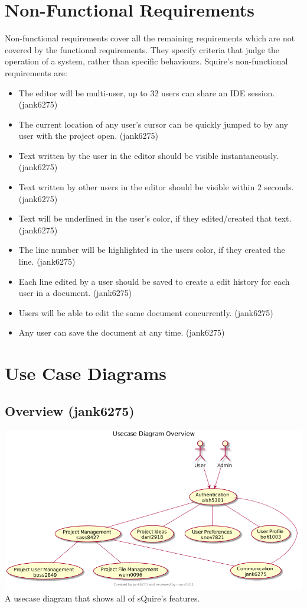 \documentclass[11pt]{report}
\begin{document}
\section{Non-Functional Requirements}
    Non-functional requirements cover all the remaining requirements which are not covered by the functional requirements. They specify criteria that judge the operation of a system, rather than specific behaviours. Squire's non-functional requirements are:
    \begin{itemize}
        \item The editor will be multi-user, up to 32 users can share an IDE session. (jank6275)
        \item The current location of any user's cursor can be quickly jumped to by any user with the project open. (jank6275)
        \item Text written by the user in the editor should be visible instantaneously. (jank6275)
        \item Text written by other users in the editor should be visible within 2 seconds. (jank6275)
        \item Text will be underlined in the user's color, if they edited/created that text. (jank6275)
        \item The line number will be highlighted in the users color, if they created the line. (jank6275)
        \item Each line edited by a user should be saved to create a edit history for each user in a document. (jank6275)
        \item Users will be able to edit the same document concurrently. (jank6275)
        \item Any user can save the document at any time. (jank6275)
    \end{itemize}



\section{Use Case Diagrams}
    \subsection{Overview (jank6275)}
        \includegraphics[width=\textwidth]{diagrams/usecase-overview}
        A usecase diagram that shows all of sQuire's features.
\end{document}
